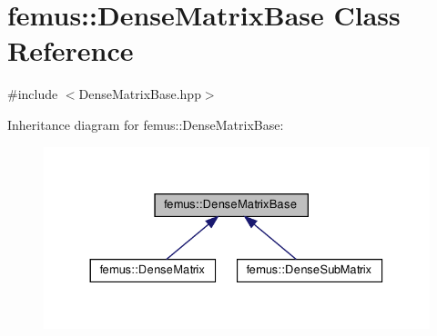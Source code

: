 \hypertarget{classfemus_1_1_dense_matrix_base}{}\section{femus\+:\+:Dense\+Matrix\+Base Class Reference}
\label{classfemus_1_1_dense_matrix_base}


{\ttfamily \#include $<$Dense\+Matrix\+Base.\+hpp$>$}



Inheritance diagram for femus\+:\+:Dense\+Matrix\+Base\+:
\nopagebreak
\begin{figure}[H]
\begin{center}
\leavevmode
\includegraphics[width=330pt]{classfemus_1_1_dense_matrix_base__inherit__graph}
\end{center}
\end{figure}
